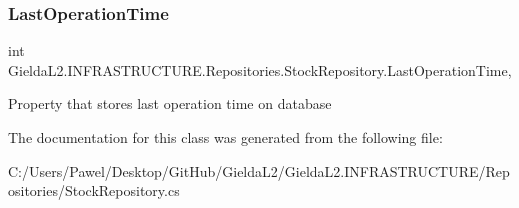 \subsubsection{\texorpdfstring{LastOperationTime}{LastOperationTime}}
{\footnotesize\ttfamily int Gielda\+L2.\+I\+N\+F\+R\+A\+S\+T\+R\+U\+C\+T\+U\+R\+E.\+Repositories.\+Stock\+Repository.\+Last\+Operation\+Time\hspace{0.3cm}{\ttfamily [get]}, {\ttfamily [set]}}



Property that stores last operation time on database 



The documentation for this class was generated from the following file\+:\begin{DoxyCompactItemize}
\item 
C\+:/\+Users/\+Pawel/\+Desktop/\+Git\+Hub/\+Gielda\+L2/\+Gielda\+L2.\+I\+N\+F\+R\+A\+S\+T\+R\+U\+C\+T\+U\+R\+E/\+Repositories/Stock\+Repository.\+cs\end{DoxyCompactItemize}
